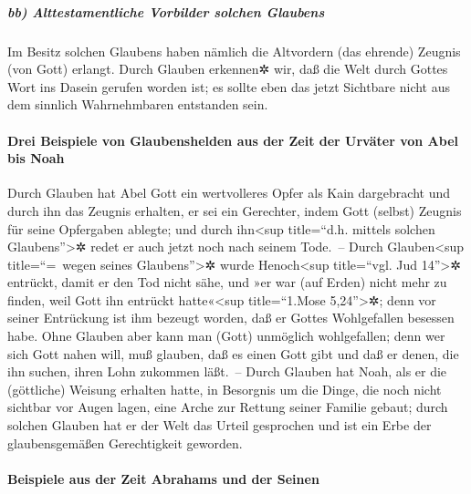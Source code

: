 \hypertarget{bb-alttestamentliche-vorbilder-solchen-glaubens}{%
\subparagraph{bb) Alttestamentliche Vorbilder solchen
Glaubens}\label{bb-alttestamentliche-vorbilder-solchen-glaubens}}

 Im Besitz solchen Glaubens haben nämlich die Altvordern
(das ehrende) Zeugnis (von Gott) erlangt.  Durch Glauben
erkennen✲ wir, daß die Welt durch Gottes Wort ins Dasein gerufen worden
ist; es sollte eben das jetzt Sichtbare nicht aus dem sinnlich
Wahrnehmbaren entstanden sein.

\hypertarget{drei-beispiele-von-glaubenshelden-aus-der-zeit-der-urvuxe4ter-von-abel-bis-noah}{%
\paragraph{Drei Beispiele von Glaubenshelden aus der Zeit der Urväter
von Abel bis
Noah}\label{drei-beispiele-von-glaubenshelden-aus-der-zeit-der-urvuxe4ter-von-abel-bis-noah}}

 Durch Glauben hat Abel Gott ein wertvolleres Opfer als
Kain dargebracht und durch ihn das Zeugnis erhalten, er sei ein
Gerechter, indem Gott (selbst) Zeugnis für seine Opfergaben ablegte; und
durch ihn\textless sup title=``d.h. mittels solchen
Glaubens''\textgreater✲ redet er auch jetzt noch nach seinem Tode.~--
 Durch Glauben\textless sup title=``=~wegen seines
Glaubens''\textgreater✲ wurde Henoch\textless sup title=``vgl. Jud
14''\textgreater✲ entrückt, damit er den Tod nicht sähe, und »er war
(auf Erden) nicht mehr zu finden, weil Gott ihn entrückt
hatte«\textless sup title=``1.Mose 5,24''\textgreater✲; denn vor seiner
Entrückung ist ihm bezeugt worden, daß er Gottes Wohlgefallen besessen
habe.  Ohne Glauben aber kann man (Gott) unmöglich
wohlgefallen; denn wer sich Gott nahen will, muß glauben, daß es einen
Gott gibt und daß er denen, die ihn suchen, ihren Lohn zukommen läßt.~--
 Durch Glauben hat Noah, als er die (göttliche) Weisung
erhalten hatte, in Besorgnis um die Dinge, die noch nicht sichtbar vor
Augen lagen, eine Arche zur Rettung seiner Familie gebaut; durch solchen
Glauben hat er der Welt das Urteil gesprochen und ist ein Erbe der
glaubensgemäßen Gerechtigkeit geworden.

\hypertarget{beispiele-aus-der-zeit-abrahams-und-der-seinen}{%
\paragraph{Beispiele aus der Zeit Abrahams und der
Seinen}\label{beispiele-aus-der-zeit-abrahams-und-der-seinen}}

